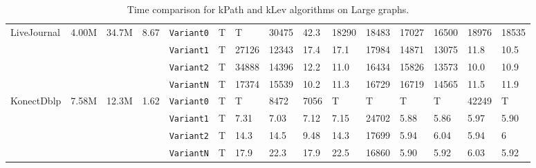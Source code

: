 \begin{table}[h!]
{\begin{tabular}{ |p{1.6cm}|p{0.9cm}|p{0.9cm}|p{0.8cm} |p{1.3cm}|p{.8cm}| p{.8cm}|p{.8cm}|p{.8cm}|p{.8cm}|p{.8cm}| p{.8cm}|p{.8cm}|p{.8cm}|p{.8cm}| }
\hline
\multirow{4}{*}{LiveJournal} & \multirow{4}{*}{4.00M} & \multirow{4}{*}{34.7M} & \multirow{4}{*}{8.67}
& \texttt{Variant0} & T & T & 30475 & 42.3 & 18290& 18483 & 17027 & 16500 & 18976 & 18535\\
& & &  & \texttt{Variant1} & T & 27126 & 12343 & 17.4 & 17.1& 17984 & 14871 & 13075 & 11.8 & 10.5\\
& & &  & \texttt{Variant2} & T & 34888 & 14396 & 12.2 & 11.0& 16434 & 15826 & 13573 & 10.0 & 10.9\\
& & &  & \texttt{VariantN} & T & 17374 & 15539 & 10.2 & 11.3& 16729 & 16719 & 14565 & 11.5 & 11.9\\
\hline
\multirow{4}{*}{KonectDblp} & \multirow{4}{*}{7.58M} & \multirow{4}{*}{12.3M} & \multirow{4}{*}{1.62}
& \texttt{Variant0} & T & T & 8472 & 7056 & T& T & T & T & 42249 & T\\
& & &  & \texttt{Variant1} & T & 7.31 & 7.03 & 7.12 & 7.15& 24702 & 5.88 & 5.86 & 5.97 & 5.90\\
& & &  & \texttt{Variant2} & T & 14.3 & 14.5 & 9.48 & 14.3& 17699 & 5.94 & 6.04 & 5.94 & 6\\
& & &  & \texttt{VariantN} & T & 17.9 & 22.3 & 17.9 & 22.5& 16860 & 5.90 & 5.92 & 6.03 & 5.92\\
\hline
\end{tabular}}
\caption{Time comparison for kPath and kLev algorithms on Large graphs.}
\label{label}
\end{table}
